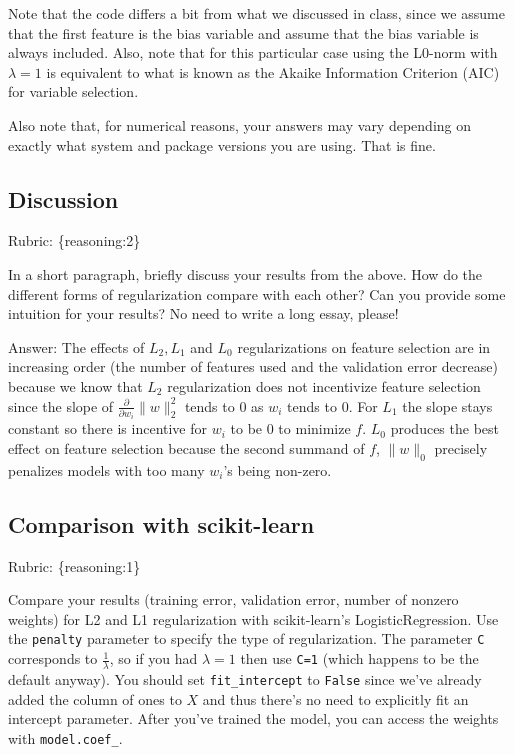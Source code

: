\documentclass{article}
\def\rubric#1{\gre{Rubric: \{#1\}}}{}
\def\gre#1{{\color{gre}#1}}
\def\norm#1{\|#1\|}
\def\ans#1{\gre{Answer: #1}}{}
\begin{document}
Note that the code differs a bit from what we discussed in class,
since we assume that the first feature is the bias variable and assume that the
bias variable is always included. Also, note that for this particular case using
the L0-norm with $\lambda=1$ is equivalent to what is known as the Akaike
Information Criterion (AIC) for variable selection.

Also note that, for numerical reasons, your answers may vary depending on exactly what system and package versions you are using. That is fine.

\subsection{Discussion}
\rubric{reasoning:2}

In a short paragraph, briefly discuss your results from the above. How do the
different forms of regularization compare with each other?
Can you provide some intuition for your results? No need to write a long essay, please!

\ans{The effects of $L_2, L_1$ and $L_0$ regularizations on feature selection are in increasing order (the number of features used and the validation error decrease) because we know that $L_2$ regularization does not incentivize feature selection since the slope of $\frac{\partial}{\partial w_i}\norm{w}_2^2$ tends to $0$ as $w_i$ tends to $0$. For $L_1$ the slope stays constant so there is incentive for $w_i$ to be $0$ to minimize $f$. $L_0$ produces the best effect on feature selection because the second summand of $f$, $\norm{w}_0$ precisely penalizes models with too many $w_i$'s being non-zero.}

\subsection{Comparison with scikit-learn}
\rubric{reasoning:1}

Compare your results (training error, validation error, number of nonzero weights) for L2 and L1 regularization with scikit-learn's LogisticRegression. Use the
\texttt{penalty} parameter to specify the type of regularization. The parameter \texttt{C} corresponds to $\frac{1}{\lambda}$, so if
you had $\lambda=1$ then use \texttt{C=1} (which happens to be the default anyway).
You should set \texttt{fit\string_intercept} to \texttt{False} since we've already added the column of ones to $X$ and thus
there's no need to explicitly fit an intercept parameter. After you've trained the model, you can access the weights
with \texttt{model.coef\string_}.
\end{document}
